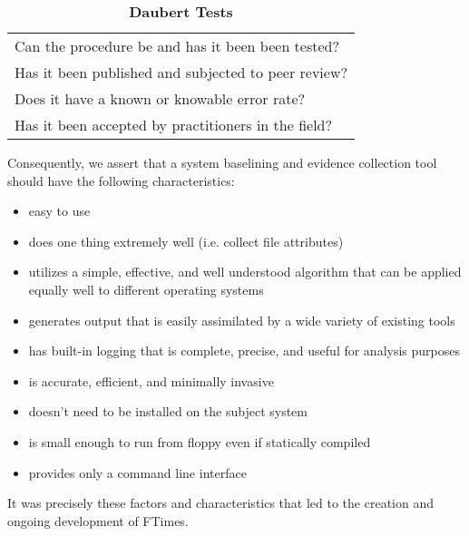 \documentclass[10pt]{article}
\begin{document}
\begin{table}[h]
\begin{center}
\caption{\bf Daubert Tests\label{tbl:daubert}}\vspace{.2em}
\begin{tabular}{l}\hline
  Can the procedure be and has it been been tested? \\
  Has it been published and subjected to peer review? \\
  Does it have a known or knowable error rate? \\
  Has it been accepted by practitioners in the field? \\
\end{tabular}
\end{center}
\end{table}

Consequently, we assert that a system baselining and
evidence collection tool should have the following characteristics:

\begin{itemize}

  \item
  easy to use

  \item
  does one thing extremely well (i.e. collect file attributes)

  \item
  utilizes a simple, effective, and well understood algorithm that
  can be applied equally well to different operating systems

  \item
  generates output that is easily assimilated by a wide variety of
  existing tools

  \item
  has built-in logging that is complete, precise, and useful for
  analysis purposes

  \item
  is accurate, efficient, and minimally invasive

  \item
  doesn't need to be installed on the subject system

  \item
  is small enough to run from floppy even if statically compiled

  \item
  provides only a command line interface

\end{itemize}

It was precisely these factors and characteristics that led
to the creation and ongoing development of FTimes.
\end{document}
